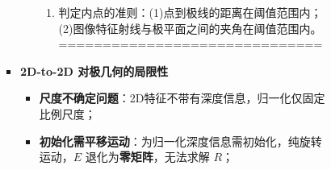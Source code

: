 \documentclass[../main.tex]{subfiles}
\begin{document}
\begin{enumerate}
\begin{itemize}
\begin{enumerate}
\begin{itemize}
\begin{itemize}
\begin{small}
\begin{itemize}
\begin{enumerate}
            \item 判定内点的准则：(1)点到极线的距离在阈值范围内；(2)图像特征射线与极平面之间的夹角在阈值范围内。
        ==============================\\
        \end{enumerate}
        \end{itemize}
        \end{small}
        \item \textbf{2D-to-2D 对极几何的局限性}
        \begin{itemize}
            \item \textbf{尺度不确定问题}：2D特征不带有深度信息，归一化仅固定比例尺度；
            \item \textbf{初始化需平移运动}：为归一化深度信息需初始化，纯旋转运动，$E$ 退化为\textbf{零矩阵}，无法求解 $R$；
        \end{itemize}


\end{itemize}
\end{itemize}
\end{enumerate}
\end{itemize}
\end{enumerate}
\end{document}
